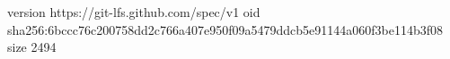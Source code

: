 version https://git-lfs.github.com/spec/v1
oid sha256:6bccc76c200758dd2c766a407e950f09a5479ddcb5e91144a060f3be114b3f08
size 2494
